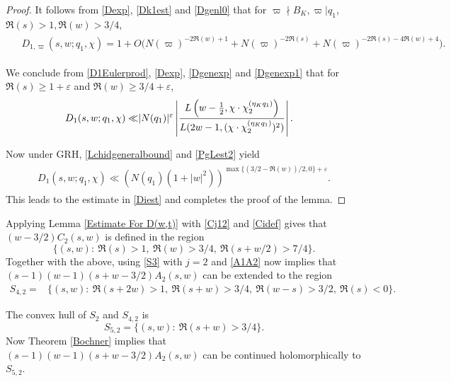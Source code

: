 \documentclass[twoside,leqno,10pt, A4]{amsart}
\begin{document}
\begin{proof}
  It follows from \eqref{Dexp}, \eqref{Dk1est} and \eqref{Dgenl0} that for $\varpi \nmid B_K, \varpi | q_1$, $\Re(s)>1, \Re(w)>3/4$,
\begin{align}
\label{Dgenexp1}	
\begin{split}
   & D_{1,\varpi}(s, w;q_1,  \chi)
=  1+O \Big (N(\varpi)^{-2\Re(w)+1}+N(\varpi)^{-2\Re(s)}+N(\varpi)^{-2\Re(s)-4\Re(w)+4}\Big )  .
\end{split}
\end{align}

  We conclude from \eqref{D1Eulerprod}, \eqref{Dexp}, \eqref{Dgenexp} and \eqref{Dgenexp1} that for $\Re(s)\geq 1+\varepsilon$ and $\Re(w)
\geq 3/4+\varepsilon$,
\begin{align*}
\begin{split}
	D_{1}(s, w; q_1, \chi) \ll	& |N(q_1)|^{\varepsilon} \left|\frac {L\left( w-\tfrac{1}{2}, \chi \cdot \chi^{(\eta_K q_1)}_2\right)}{L(2w-1,
(\chi \cdot \chi^{(\eta_K q_1)}_2)^2)} \right|.
\end{split}
\end{align*}

Now under GRH, \eqref{Lchidgeneralbound} and \eqref{PgLest2} yield
\begin{align*}
\begin{split}
	D_{1}(s, w; q_1, \chi) \ll	 (N(q_1)(1+|w|^2))^{\max \{  (3/2-\Re(w))/2, 0 \}+\varepsilon}.
\end{split}
\end{align*}
 This leads to the estimate in \eqref{Diest} and completes the proof of the lemma.
\end{proof}

Applying Lemma \ref{Estimate For D(w,t)} with \eqref{Cj12} and \eqref{Cidef} gives that $(w-3/2)C_2(s,w)$ is defined in the region
\begin{equation*}
		\{(s,w):\ \Re(s)>1, \ \Re(w)>3/4, \ \Re(s+w/2)>7/4 \}.
\end{equation*}
Together with the above, using \eqref{S3} with $j=2$ and \eqref{A1A2} now implies that $(s-1)(w-1)(s+w-3/2)A_2(s,w)$ can be extended to the region
\begin{align*}
		S_{4,2}=& \{(s,w): \ \Re(s+2w)>1, \ \Re(s+w)>3/4,\ \Re(w-s)>3/2,  \ \Re(s)<0\}.
\end{align*}

The convex hull of $S_2$ and $S_{4,2}$ is
\begin{equation*}
		S_{5,2}=\{(s,w):\ \Re(s+w)>3/4 \}.
\end{equation*}
Now Theorem \ref{Bochner} implies that $(s-1)(w-1)(s+w-3/2)A_2(s,w)$ can be continued holomorphically to $S_{5,2}$.
\end{document}
